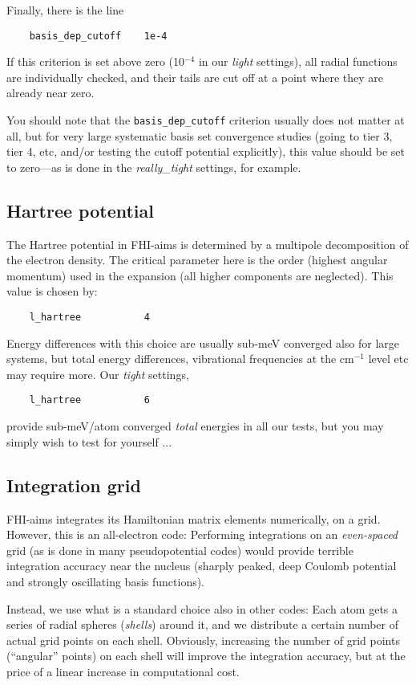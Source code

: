 Finally, there is the line
\begin{verbatim}
    basis_dep_cutoff    1e-4
\end{verbatim}
If this criterion is set above zero (10$^{-4}$ in our \emph{light} settings),
all radial functions are individually checked, and their tails are cut off at
a point where they are already near zero.

You should note that the \texttt{basis\_dep\_cutoff} criterion usually does
not matter at all, but for very large systematic basis set convergence studies
(going to tier 3, tier 4, etc, and/or testing the cutoff potential
explicitly), this value should be set to zero---as is done in the
\emph{really\_tight} settings, for example.

\subsection{Hartree potential}

The Hartree potential in FHI-aims is determined by a multipole decomposition
of the electron density. The critical parameter here is the order (highest
angular momentum) used in the expansion (all higher components are
neglected). This value is chosen by:
\begin{verbatim}
    l_hartree           4
\end{verbatim}
Energy differences with this choice are usually sub-meV converged also for
large systems, but total energy differences, vibrational frequencies at the
cm$^{-1}$ level etc may require more. Our \emph{tight} settings, 
\begin{verbatim}
    l_hartree           6
\end{verbatim}
provide sub-meV/atom converged \emph{total} energies in all our tests, but
you may simply wish to test for yourself ...

\subsection{Integration grid}

FHI-aims integrates its Hamiltonian matrix elements numerically, on a
grid. However, this is an all-electron code: Performing integrations on an
\emph{even-spaced} grid (as is done in many pseudopotential codes) would
provide terrible integration accuracy near the nucleus (sharply peaked, deep
Coulomb potential and strongly oscillating basis functions). 

Instead, we use what is a standard choice also in other codes: Each atom gets
a series of radial spheres (\emph{shells}) around it, and we distribute a certain number
of actual grid points on each shell. Obviously, increasing the number of grid
points (``angular'' points) on each shell will improve the integration
accuracy, but at the price of a linear increase in computational cost.

